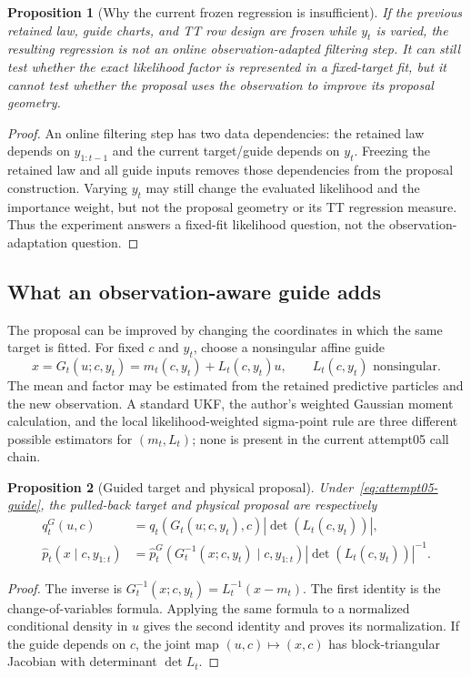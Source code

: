 \documentclass[11pt]{article}
\newtheorem{proposition}{Proposition}
\newcommand{\absdet}[1]{\left|\det\!\left(#1\right)\right|}
\begin{document}
\begin{proposition}[Why the current frozen regression is insufficient]
\label{prop:frozen-insufficient}
If the previous retained law, guide charts, and TT row design are frozen while
$y_t$ is varied, the resulting regression is not an online observation-adapted
filtering step. It can still test whether the exact likelihood factor is
represented in a fixed-target fit, but it cannot test whether the proposal
uses the observation to improve its proposal geometry.
\end{proposition}
\begin{proof}
An online filtering step has two data dependencies: the retained law depends
on $y_{1:t-1}$ and the current target/guide depends on $y_t$. Freezing the
retained law and all guide inputs removes those dependencies from the proposal
construction. Varying $y_t$ may still change the evaluated likelihood and the
importance weight, but not the proposal geometry or its TT regression measure.
Thus the experiment answers a fixed-fit likelihood question, not the
observation-adaptation question.
\end{proof}

\subsection{What an observation-aware guide adds}

The proposal can be improved by changing the coordinates in which the same
target is fitted. For fixed $c$ and $y_t$, choose a nonsingular affine guide
\begin{equation}
 x=G_t(u;c,y_t)=m_t(c,y_t)+L_t(c,y_t)u,
 \qquad L_t(c,y_t)\text{ nonsingular}.
 \label{eq:attempt05-guide}
\end{equation}
The mean and factor may be estimated from the retained predictive particles
and the new observation. A standard UKF, the author's weighted Gaussian
moment calculation, and the local likelihood-weighted sigma-point rule are
three different possible estimators for $(m_t,L_t)$; none is present in the
current attempt05 call chain.

\begin{proposition}[Guided target and physical proposal]
\label{prop:guided-target}
Under~\eqref{eq:attempt05-guide}, the pulled-back target and physical proposal
are respectively
\begin{align}
 q_t^G(u,c)&=q_t(G_t(u;c,y_t),c)\absdet{L_t(c,y_t)},\\
 \widehat p_t(x\mid c,y_{1:t})&=
 \widehat p_t^G(G_t^{-1}(x;c,y_t)\mid c,y_{1:t})
 \absdet{L_t(c,y_t)}^{-1}.
 \label{eq:guided-proposal}
\end{align}
\end{proposition}
\begin{proof}
The inverse is $G_t^{-1}(x;c,y_t)=L_t^{-1}(x-m_t)$. The first identity is
the change-of-variables formula. Applying the same formula to a normalized
conditional density in $u$ gives the second identity and proves its
normalization. If the guide depends on $c$, the joint map $(u,c)\mapsto(x,c)$
has block-triangular Jacobian with determinant $\det L_t$.
\end{proof}
\end{document}
